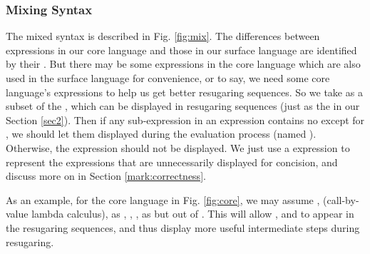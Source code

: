 \subsubsection{Mixing Syntax}
\label{mark:displayable}
The mixed syntax is described in Fig.  \ref{fig:mix}.
%
The differences between expressions in our core language and those in our surface language are identified by their . But there may be some expressions in the core language which are also used in the surface language for convenience, or to say, we need some core language's expressions to help us get better resugaring sequences. So we take  as a subset of the , which can be displayed in resugaring sequences (just as the  in our Section \ref{sec2}). Then if any sub-expression in an expression contains no  except for , we should let them displayed during the evaluation process (named ). Otherwise, the expression should not be displayed. We just use a  expression to represent the expressions that are unnecessarily displayed for concision, and discuss more on   in Section \ref{mark:correctness}.





As an example, for the core language in Fig.  \ref{fig:core},
we may assume , \m{$\lambda$} (call-by-value lambda calculus),  as , , ,  as  but out of . This will allow , \m{$\lambda$} and  to appear in the resugaring sequences, and thus display more useful intermediate steps during resugaring.

